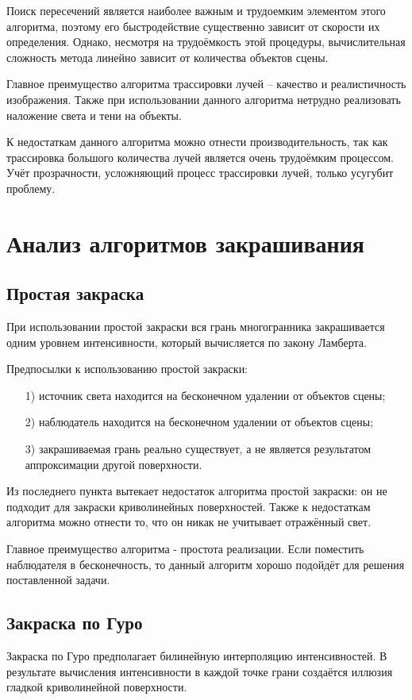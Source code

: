 Поиск пересечений является наиболее важным и трудоемким элементом этого алгоритма, поэтому его быстродействие существенно зависит от скорости их определения. Однако, несмотря на трудоёмкость этой процедуры, вычислительная сложность метода линейно зависит от количества объектов сцены. 

Главное преимущество алгоритма трассировки лучей – качество и реалистичность изображения. Также при использовании данного алгоритма нетрудно реализовать наложение света и тени на объекты.

К недостаткам данного алгоритма можно отнести производительность, так как трассировка большого количества лучей является очень трудоёмким процессом. Учёт прозрачности, усложняющий процесс трассировки лучей, только усугубит проблему.

\section{Анализ алгоритмов закрашивания}
\subsection{Простая закраска}
При использовании простой закраски вся грань многогранника закрашивается одним уровнем интенсивности, который вычисляется по закону Ламберта.

Предпосылки к использованию простой закраски:
\begin{enumerate}
	\item[1)] источник света находится на бесконечном удалении от объектов сцены;
	\item[2)] наблюдатель находится на бесконечном удалении от объектов сцены;
	\item[3)] закрашиваемая грань реально существует, а не является результатом аппроксимации другой поверхности.
\end{enumerate}

Из последнего пункта вытекает недостаток алгоритма простой закраски: он не подходит для закраски криволинейных поверхностей. Также к недостаткам алгоритма можно отнести то, что он никак не учитывает отражённый свет.

Главное преимущество алгоритма - простота реализации. Если поместить наблюдателя в бесконечность, то данный алгоритм хорошо подойдёт для решения поставленной задачи.

\subsection{Закраска по Гуро}
Закраска по Гуро предполагает билинейную интерполяцию интенсивностей. В результате вычисления интенсивности в каждой точке грани создаётся иллюзия гладкой криволинейной поверхности.

